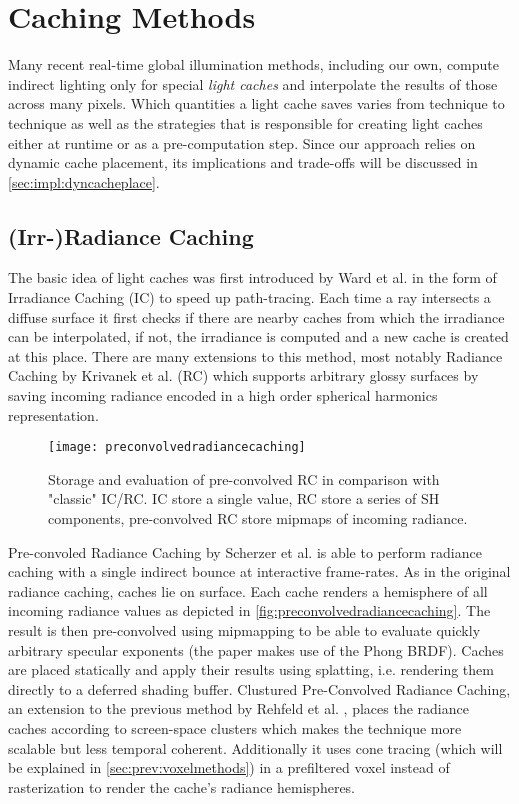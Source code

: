 \documentclass[thesis.tex]{subfiles}
\begin{document}
\section{Caching Methods}
Many recent real-time global illumination methods, including our own, compute indirect lighting only for special \emph{light caches} and interpolate the results of those across many pixels.
Which quantities a light cache saves varies from technique to technique as well as the strategies that is responsible for creating light caches either at runtime or as a pre-computation step.
Since our approach relies on dynamic cache placement, its implications and trade-offs will be discussed in \autoref{sec:impl:dyncacheplace}.

\subsection{(Irr-)Radiance Caching}
The basic idea of light caches was first introduced by Ward et al. \cite{bib:irradiancecaching} in the form of Irradiance Caching (IC) to speed up path-tracing.
Each time a ray intersects a diffuse surface it first checks if there are nearby caches from which the irradiance can be interpolated, if not, the irradiance is computed and a new cache is created at this place.
There are many extensions to this method, most notably Radiance Caching by Krivanek et al. \cite{bib:radiancecaching} (RC) which supports arbitrary glossy surfaces by saving incoming radiance encoded in a high order spherical harmonics representation.

\begin{figure}[h]
	\centering
	\texttt{[image: preconvolvedradiancecaching]}
	\caption{\cite{bib:preconvoledradiancecaching} Storage and evaluation of pre-convolved RC in comparison with "classic" IC/RC.
	IC store a single value,
	RC store a series of SH components,
	pre-convolved RC store mipmaps of incoming radiance.} \label{fig:preconvolvedradiancecaching}
\end{figure}
Pre-convoled Radiance Caching by Scherzer et al. \cite{bib:preconvoledradiancecaching} is able to perform radiance caching with a single indirect bounce at interactive frame-rates.
As in the original radiance caching, caches lie on surface.
Each cache renders a hemisphere of all incoming radiance values as depicted in \autoref{fig:preconvolvedradiancecaching}.
The result is then pre-convolved using mipmapping to be able to evaluate quickly arbitrary specular exponents (the paper makes use of the Phong BRDF).
Caches are placed statically and apply their results using splatting, i.e. rendering them directly to a deferred shading buffer.
Clustured Pre-Convolved Radiance Caching, an extension to the previous method by Rehfeld et al. \cite{bib:clusteredpreconvoledradiancecaching}, places the radiance caches according to screen-space clusters which makes the technique more scalable but less temporal coherent.
Additionally it uses cone tracing (which will be explained in \autoref{sec:prev:voxelmethods}) in a prefiltered voxel instead of rasterization to render the cache's radiance hemispheres.
\end{document}
